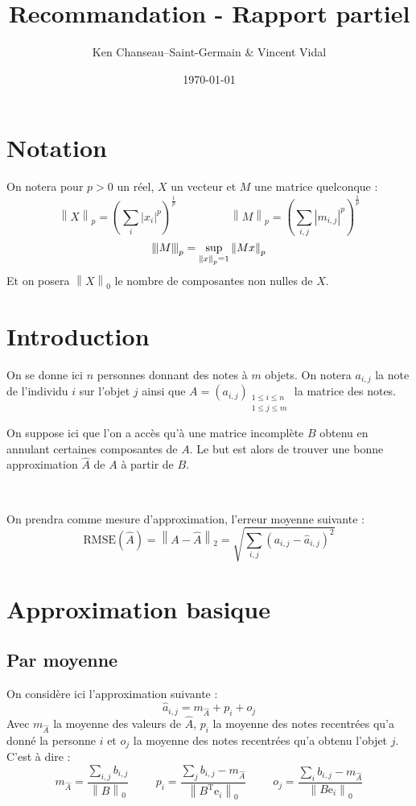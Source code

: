 \documentclass[12pt, a4paper]{article}
\newcommand{\B}{B} %
\newcommand{\Ap}{\widehat{A}} %
\newcommand{\Ac}[2]{a_{#1,#2}} %
\newcommand{\Bc}[2]{b_{#1,#2}} %
\newcommand{\Apc}[2]{\widehat{a}_{#1,#2}} %
\newcommand{\rmse}[1]{\mathrm{RMSE}\pp{#1}} %
\newcommand{\norme}[2]{\left\lVert #1 \right\rVert_{#2}} %
\newcommand{\tnorme}[2]{\left|\hspace{-1pt}\left\lVert #1 \right\rVert\hspace{-1pt}\right|_{#2}} %
\newcommand{\tr}[1]{#1^{\mathrm{T}}} %
\newcommand{\ei}[1]{\mathrm{e}_i} %
\newcommand{\pp}[1]{\left(#1\right)} %
\newcommand{\sdl}{

~

} %
\begin{document}
\title{Recommandation - Rapport partiel}
\author{Ken Chanseau--Saint-Germain \& Vincent Vidal}
\date{\today}
\maketitle

\tableofcontents

\section*{Notation}
On notera pour $p>0$ un réel, $X$ un vecteur et $M$ une matrice quelconque : \[
	\norme{X}{p} = \pp{\sum_i \left|x_i\right|^p}^{\frac{1}{p}} \hspace{2cm} 
	\norme{M}{p} = \pp{\sum_{i, j} \left|m_{i,j}\right|^p}^{\frac{1}{p}}
\]\[
	\tnorme{M}{p} = \sup_{\norme{x}{p}=1} \norme{Mx}{p}
\]
Et on posera $\norme{X}{0}$ le nombre de composantes non nulles de $X$. 

\section{Introduction}

On se donne ici $n$ personnes donnant des notes à $m$ objets.\newline
On notera $\Ac{i}{j}$ la note de l'individu $i$ sur l'objet $j$ ainsi que $A = \pp{\Ac{i}{j}}_{\substack{1\leq i\leq n \\ 1 \leq j \leq m}}$ la matrice des notes.

On suppose ici que l'on a accès qu'à une matrice incomplète $\B$ obtenu en annulant certaines composantes de $A$. Le but est alors de trouver une bonne approximation $\Ap$ de $A$ à partir de $\B$.

\sdl

On prendra comme mesure d'approximation, l'erreur moyenne suivante :
\[
	\rmse{\Ap} = \norme{A-\Ap}{2} = \sqrt{\sum_{i,j} \pp{\Ac{i}{j} - \Apc{i}{j}}^2}
\]

\section{Approximation basique}
\subsection{Par moyenne}

On considère ici l'approximation suivante : \[
\Apc{i}{j} = m_{\Ap} + p_i + o_j
\]
Avec $m_{\Ap}$ la moyenne des valeurs de $\Ap$, $p_i$ la moyenne des notes recentrées qu'a donné la personne $i$ et $o_j$ la moyenne des notes recentrées qu'a obtenu l'objet $j$. C'est à dire : \[
	m_{\Ap} = \frac{\sum_{i,j}\Bc{i}{j}}{\norme{\B}{0}}  \hspace{1cm}
	p_i = \frac{\sum_{j}\Bc{i}{j} - m_{\Ap}}{\norme{\tr{\B}\ei{i}}{0}} \hspace{1cm}
	o_j = \frac{\sum_{i}\Bc{i}{j} - m_{\Ap}}{\norme{\B\ei{j}}{0}}
\]
\end{document}
